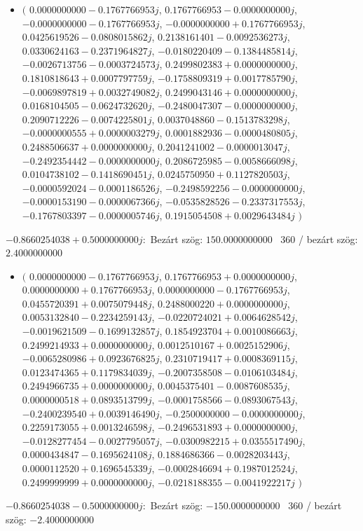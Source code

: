 \documentclass[14pt,a4paper]{article}
\begin{document}
\begin{itemize}
\item
$\big($
$0.0000000000-0.1767766953j$, $0.1767766953-0.0000000000j$, $-0.0000000000-0.1767766953j$, $-0.0000000000+0.1767766953j$, $0.0425619526-0.0808015862j$, $0.2138161401-0.0092536273j$, $0.0330624163-0.2371964827j$, $-0.0180220409-0.1384485814j$, $-0.0026713756-0.0003724573j$, $0.2499802383+0.0000000000j$, $0.1810818643+0.0007797759j$, $-0.1758809319+0.0017785790j$, $-0.0069897819+0.0032749082j$, $0.2499043146+0.0000000000j$, $0.0168104505-0.0624732620j$, $-0.2480047307-0.0000000000j$, $0.2090712226-0.0074225801j$, $0.0037048860-0.1513783298j$, $-0.0000000555+0.0000003279j$, $0.0001882936-0.0000480805j$, $0.2488506637+0.0000000000j$, $0.2041241002-0.0000013047j$, $-0.2492354442-0.0000000000j$, $0.2086725985-0.0058666098j$, $0.0104738102-0.1418690451j$, $0.0245750950+0.1127820503j$, $-0.0000592024-0.0001186526j$, $-0.2498592256-0.0000000000j$, $-0.0000153190-0.0000067366j$, $-0.0535828526-0.2337317553j$, $-0.1767803397-0.0000005746j$, $0.1915054508+0.0029643484j$
$\big)$
\end{itemize}
$-0.8660254038+0.5000000000j$:\
Bezárt szög: $150.0000000000$ \
360 / bezárt szög: $2.4000000000$\
\begin{itemize}
\item
$\big($
$0.0000000000-0.1767766953j$, $0.1767766953+0.0000000000j$, $0.0000000000+0.1767766953j$, $0.0000000000-0.1767766953j$, $0.0455720391+0.0075079448j$, $0.2488000220+0.0000000000j$, $0.0053132840-0.2234259143j$, $-0.0220724021+0.0064628542j$, $-0.0019621509-0.1699132857j$, $0.1854923704+0.0010086663j$, $0.2499214933+0.0000000000j$, $0.0012510167+0.0025152906j$, $-0.0065280986+0.0923676825j$, $0.2310719417+0.0008369115j$, $0.0123474365+0.1179834039j$, $-0.2007358508-0.0106103484j$, $0.2494966735+0.0000000000j$, $0.0045375401-0.0087608535j$, $0.0000000518+0.0893513799j$, $-0.0001758566-0.0893067543j$, $-0.2400239540+0.0039146490j$, $-0.2500000000-0.0000000000j$, $0.2259173055+0.0013246598j$, $-0.2496531893+0.0000000000j$, $-0.0128277454-0.0027795057j$, $-0.0300982215+0.0355517490j$, $0.0000434847-0.1695624108j$, $0.1884686366-0.0028203443j$, $0.0000112520+0.1696545339j$, $-0.0002846694+0.1987012524j$, $0.2499999999+0.0000000000j$, $-0.0218188355-0.0041922217j$
$\big)$
\end{itemize}
$-0.8660254038-0.5000000000j$:\
Bezárt szög: $-150.0000000000$ \
360 / bezárt szög: $-2.4000000000$\
\end{document}
